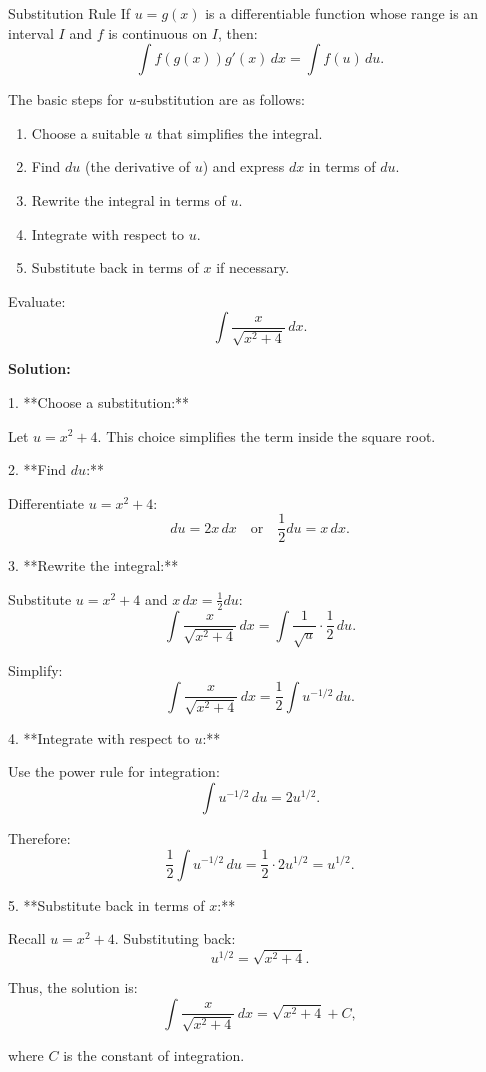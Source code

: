 \documentclass[12pt]{article}
\theoremstyle{beautifulthm}
\begin{document}
\begin{mytheorem}{Substitution Rule}{}
    If $u = g(x)$ is a differentiable function whose range is an interval $I$ and $f$ is continuous on $I$, then:
\[
\int f(g(x)) g'(x) \, dx = \int f(u) \, du.
\]


The basic steps for \( u \)-substitution are as follows:
\begin{enumerate}
    \item Choose a suitable \( u \) that simplifies the integral.
    \item Find \( du \) (the derivative of \( u \)) and express \( dx \) in terms of \( du \).
    \item Rewrite the integral in terms of \( u \).
    \item Integrate with respect to \( u \).
    \item Substitute back in terms of \( x \) if necessary.
\end{enumerate}
\end{mytheorem}

\begin{tcolorbox}[colback=examplebg, colframe=red!75!black, title=\textbf{EXAMPLE 2: Find the Integral of the Function}, fonttitle=\bfseries, sharp corners]

Evaluate:
\[
\int \frac{x}{\sqrt{x^2 + 4}} \, dx.
\]

\tcblower
\textbf{Solution:} 

1. **Choose a substitution:**

   Let \( u = x^2 + 4 \). This choice simplifies the term inside the square root.

2. **Find \( du \):**

   Differentiate \( u = x^2 + 4 \):
   \[
   du = 2x \, dx \quad \text{or} \quad \frac{1}{2} du = x \, dx.
   \]

3. **Rewrite the integral:**

   Substitute \( u = x^2 + 4 \) and \( x \, dx = \frac{1}{2} du \):
   \[
   \int \frac{x}{\sqrt{x^2 + 4}} \, dx = \int \frac{1}{\sqrt{u}} \cdot \frac{1}{2} \, du.
   \]

   Simplify:
   \[
   \int \frac{x}{\sqrt{x^2 + 4}} \, dx = \frac{1}{2} \int u^{-1/2} \, du.
   \]

4. **Integrate with respect to \( u \):**

   Use the power rule for integration:
   \[
   \int u^{-1/2} \, du = 2u^{1/2}.
   \]

   Therefore:
   \[
   \frac{1}{2} \int u^{-1/2} \, du = \frac{1}{2} \cdot 2u^{1/2} = u^{1/2}.
   \]

5. **Substitute back in terms of \( x \):**

   Recall \( u = x^2 + 4 \). Substituting back:
   \[
   u^{1/2} = \sqrt{x^2 + 4}.
   \]

   Thus, the solution is:
   \[
   \int \frac{x}{\sqrt{x^2 + 4}} \, dx = \sqrt{x^2 + 4} + C,
   \]

   where \( C \) is the constant of integration.

\end{tcolorbox}
\end{document}
